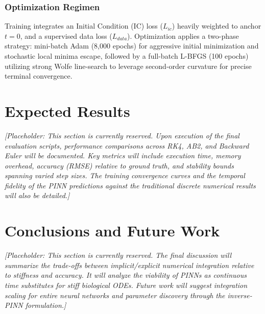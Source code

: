 \documentclass[conference]{IEEEtran}
\begin{document}
\subsubsection{Optimization Regimen}
Training integrates an Initial Condition (IC) loss ($L_{ic}$) heavily weighted to anchor $t=0$, and a supervised data loss ($L_{data}$). Optimization applies a two-phase strategy: mini-batch Adam (8,000 epochs) for aggressive initial minimization and stochastic local minima escape, followed by a full-batch L-BFGS (100 epochs) utilizing strong Wolfe line-search to leverage second-order curvature for precise terminal convergence.

\section{Expected Results}

\textit{[Placeholder: This section is currently reserved. Upon execution of the final evaluation scripts, performance comparisons across RK4, AB2, and Backward Euler will be documented. Key metrics will include execution time, memory overhead, accuracy (RMSE) relative to ground truth, and stability bounds spanning varied step sizes. The training convergence curves and the temporal fidelity of the PINN predictions against the traditional discrete numerical results will also be detailed.]}

\section{Conclusions and Future Work}

\textit{[Placeholder: This section is currently reserved. The final discussion will summarize the trade-offs between implicit/explicit numerical integration relative to stiffness and accuracy. It will analyze the viability of PINNs as continuous time substitutes for stiff biological ODEs. Future work will suggest integration scaling for entire neural networks and parameter discovery through the inverse-PINN formulation.]}
\end{document}
